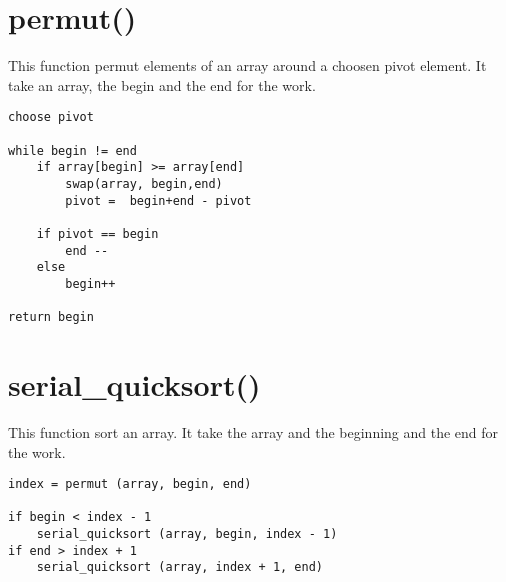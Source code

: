 \section{permut()}

This function permut elements of an array around a choosen pivot element. It take an array, the begin and the end for the work.

\begin{verbatim}
choose pivot

while begin != end
    if array[begin] >= array[end] 
        swap(array, begin,end)
        pivot =  begin+end - pivot
	 
    if pivot == begin
        end --
    else
        begin++

return begin
\end{verbatim}

\section{serial\_quicksort()}

This function sort an array. It take the array and the beginning and the end for the work.

\begin{verbatim}
index = permut (array, begin, end)

if begin < index - 1
    serial_quicksort (array, begin, index - 1)
if end > index + 1
    serial_quicksort (array, index + 1, end)
\end{verbatim}
